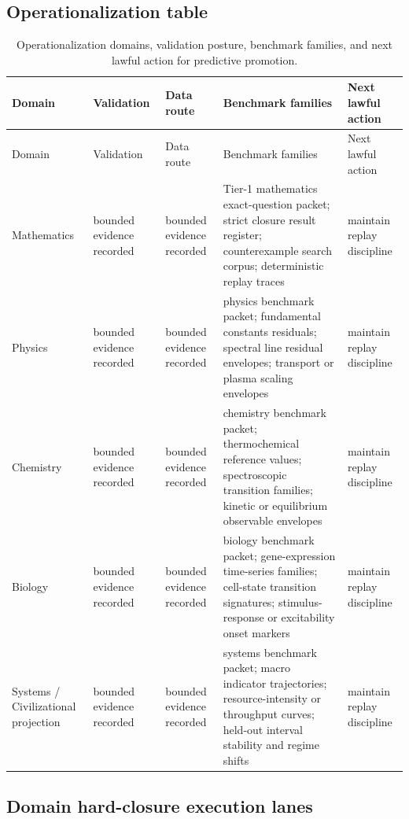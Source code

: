\subsection{Operationalization table}
\begin{octablescope}
\begin{longtable}{@{}L{0.13\textwidth}L{0.14\textwidth}L{0.17\textwidth}L{0.31\textwidth}L{0.15\textwidth}@{}}
\caption{Operationalization domains, validation posture, benchmark families, and next lawful action for predictive promotion.}\label{tab:r013-operationalization-program}\\
\toprule
Domain & Validation & Data route & Benchmark families & Next lawful action \\
\midrule
\endfirsthead
\toprule
Domain & Validation & Data route & Benchmark families & Next lawful action \\
\midrule
\endhead
Mathematics & bounded evidence recorded & bounded evidence recorded & Tier-1 mathematics exact-question packet; strict closure result register; counterexample search corpus; deterministic replay traces & maintain replay discipline \\
Physics & bounded evidence recorded & bounded evidence recorded & physics benchmark packet; fundamental constants residuals; spectral line residual envelopes; transport or plasma scaling envelopes & maintain replay discipline \\
Chemistry & bounded evidence recorded & bounded evidence recorded & chemistry benchmark packet; thermochemical reference values; spectroscopic transition families; kinetic or equilibrium observable envelopes & maintain replay discipline \\
Biology & bounded evidence recorded & bounded evidence recorded & biology benchmark packet; gene-expression time-series families; cell-state transition signatures; stimulus-response or excitability onset markers & maintain replay discipline \\
Systems / Civilizational projection & bounded evidence recorded & bounded evidence recorded & systems benchmark packet; macro indicator trajectories; resource-intensity or throughput curves; held-out interval stability and regime shifts & maintain replay discipline \\
\bottomrule
\end{longtable}
\end{octablescope}

\subsection{Domain hard-closure execution lanes}
